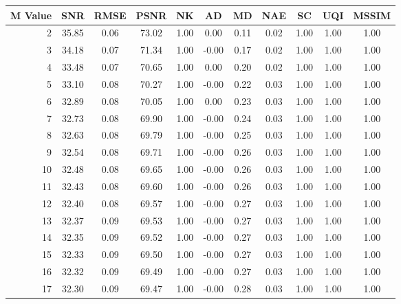     \begin{table}[htb]
       \small

    \centering 
    \begin{tabular}{|r|cccccccccc|}\hline
   M Value &  SNR &  RMSE &  PSNR &  NK &  AD &  MD &  NAE &  SC &  UQI &  MSSIM \\ \hline 
      2 &  35.85 &  0.06 &  73.02 &  1.00 &  0.00 &  0.11 &  0.02 &  1.00 &  1.00 &  1.00  \\ \hline 
      3 &  34.18 &  0.07 &  71.34 &  1.00 &  -0.00 &  0.17 &  0.02 &  1.00 &  1.00 &  1.00  \\ \hline 
      4 &  33.48 &  0.07 &  70.65 &  1.00 &  0.00 &  0.20 &  0.02 &  1.00 &  1.00 &  1.00  \\ \hline 
      5 &  33.10 &  0.08 &  70.27 &  1.00 &  -0.00 &  0.22 &  0.03 &  1.00 &  1.00 &  1.00  \\ \hline 
      6 &  32.89 &  0.08 &  70.05 &  1.00 &  0.00 &  0.23 &  0.03 &  1.00 &  1.00 &  1.00  \\ \hline 
      7 &  32.73 &  0.08 &  69.90 &  1.00 &  -0.00 &  0.24 &  0.03 &  1.00 &  1.00 &  1.00  \\ \hline 
      8 &  32.63 &  0.08 &  69.79 &  1.00 &  -0.00 &  0.25 &  0.03 &  1.00 &  1.00 &  1.00  \\ \hline 
      9 &  32.54 &  0.08 &  69.71 &  1.00 &  -0.00 &  0.26 &  0.03 &  1.00 &  1.00 &  1.00  \\ \hline 
      10 &  32.48 &  0.08 &  69.65 &  1.00 &  -0.00 &  0.26 &  0.03 &  1.00 &  1.00 &  1.00  \\ \hline 
      11 &  32.43 &  0.08 &  69.60 &  1.00 &  -0.00 &  0.26 &  0.03 &  1.00 &  1.00 &  1.00  \\ \hline 
      12 &  32.40 &  0.08 &  69.57 &  1.00 &  -0.00 &  0.27 &  0.03 &  1.00 &  1.00 &  1.00  \\ \hline 
      13 &  32.37 &  0.09 &  69.53 &  1.00 &  -0.00 &  0.27 &  0.03 &  1.00 &  1.00 &  1.00  \\ \hline 
      14 &  32.35 &  0.09 &  69.52 &  1.00 &  -0.00 &  0.27 &  0.03 &  1.00 &  1.00 &  1.00  \\ \hline 
      15 &  32.33 &  0.09 &  69.50 &  1.00 &  -0.00 &  0.27 &  0.03 &  1.00 &  1.00 &  1.00  \\ \hline 
      16 &  32.32 &  0.09 &  69.49 &  1.00 &  -0.00 &  0.27 &  0.03 &  1.00 &  1.00 &  1.00  \\ \hline 
      17 &  32.30 &  0.09 &  69.47 &  1.00 &  -0.00 &  0.28 &  0.03 &  1.00 &  1.00 &  1.00  \\ \hline 

\end{tabular}
\end{table}
